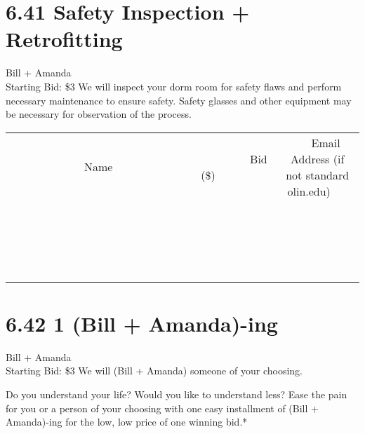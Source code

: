 \documentclass[11pt]{article}
\begin{document}
\section*{6.41 Safety Inspection + Retrofitting}
Bill + Amanda
\\
Starting Bid: \$3
\newline
We will inspect your dorm room for safety flaws and perform necessary maintenance to ensure safety. Safety glasses and other equipment may be necessary for observation of the process.
\\[3ex]
\begin{tabular}{c c c}
~~~~~~~~~~~~~Name~~~~~~~~~~~~~ & ~~~~~~~~~Bid (\$)~~~~~~~~~  & ~~~Email Address (if not standard olin.edu)~~~\\
 & & \\
\hline
 & & \\
\hline
 & & \\
\hline
 & & \\
\hline
 & & \\
\hline
 & & \\
\hline
 & & \\
\hline
 & & \\
\hline
 & & \\
\hline
 & & \\
\hline
 & & \\
\hline
 & & \\
\hline
 & & \\
\hline
 & & \\
\hline
 & & \\
\hline
 & & \\
\hline
 & & \\
\hline
 & & \\
\hline
 & & \\
\hline
\end{tabular}
\newpage
\section*{6.42 1 (Bill + Amanda)-ing}
Bill + Amanda
\\
Starting Bid: \$3
\newline
We will (Bill + Amanda) someone of your choosing.

Do you understand your life? Would you like to understand less? Ease the pain for you or a person of your choosing with one easy installment of (Bill + Amanda)-ing for the low, low price of one winning bid.*
\end{document}
